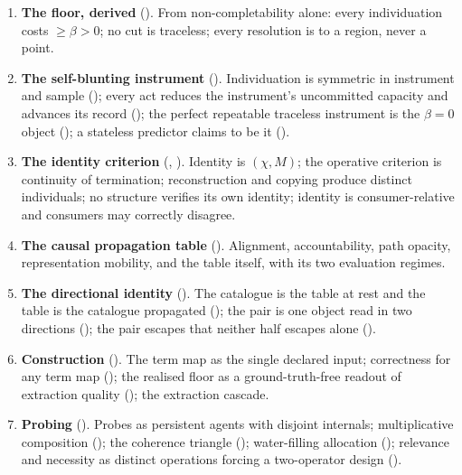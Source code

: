 \documentclass[11pt,twocolumn,a4paper]{article}
\theoremstyle{dirthm}
\theoremstyle{definition}
\theoremstyle{remark}
\newcommand{\flo}{\beta}
\newcommand{\rec}{M}
\newcommand{\Char}{\chi}
\begin{document}
\begin{enumerate}[leftmargin=1.5em,itemsep=2.5pt]
\item \textbf{The floor, derived} (). From non-completability
alone: every individuation costs $\ge\flo>0$; no cut is traceless; every
resolution is to a region, never a point.

\item \textbf{The self-blunting instrument} (). Individuation is
symmetric in instrument and sample (); every act reduces
the instrument's uncommitted capacity and advances its record
(); the perfect repeatable traceless instrument is the
$\flo=0$ object (); a stateless predictor claims to be
it ().

\item \textbf{The identity criterion} (,
). Identity is $(\Char,\rec)$; the operative
criterion is continuity of termination; reconstruction and copying produce
distinct individuals; no structure verifies its own identity; identity is
consumer-relative and consumers may correctly disagree.

\item \textbf{The causal propagation table} (). Alignment,
accountability, path opacity, representation mobility, and the table itself,
with its two evaluation regimes.

\item \textbf{The directional identity} (). The
catalogue is the table at rest and the table is the catalogue propagated
(); the pair is one object read in two directions
(); the pair escapes  that neither half
escapes alone ().

\item \textbf{Construction} (). The term map as the
single declared input; correctness for any term map
(); the realised floor as a ground-truth-free readout
of extraction quality (); the extraction cascade.

\item \textbf{Probing} (). Probes as persistent agents with
disjoint internals; multiplicative composition ();
the coherence triangle (); water-filling allocation
(); relevance and necessity as distinct operations
forcing a two-operator design ().


\end{enumerate}
\end{document}
